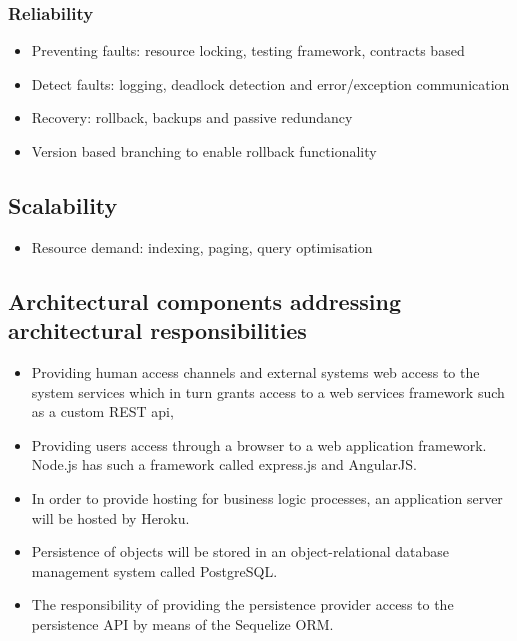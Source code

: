 \documentclass{article}
\begin{document}
		\subsubsection{Reliability}
		\begin{itemize}
			\item Preventing faults: resource locking, testing framework, contracts based
			\item Detect faults: logging, deadlock detection and error/exception communication
			\item Recovery: rollback, backups and passive redundancy
			\item Version based branching to enable rollback functionality
		\end{itemize}

		\subsection{Scalability}
		\begin{itemize}
			\item Resource demand: indexing, paging, query optimisation
		\end{itemize}

	\subsection{Architectural components addressing architectural responsibilities}
		\begin{itemize}
		\item Providing human access channels and external systems web access to the system services which in turn grants access to a web services framework such as a custom REST api,
		\item Providing users access through a browser to a web application framework. Node.js has such a framework called express.js and AngularJS.
		\item In order to provide hosting for business logic processes, an application server will be hosted by Heroku.
		\item Persistence of objects will be stored in an object-relational database management system called PostgreSQL.
		\item The responsibility of providing the persistence provider access to the persistence API by means of the Sequelize ORM.
		\end{itemize}
\end{document}
